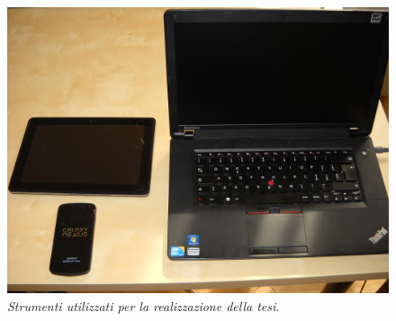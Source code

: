 \begin{figure}[thp]
\centering
\includegraphics[scale=0.1]{img/lavoro.JPG}
\caption{\textit{Strumenti utilizzati per la realizzazione della tesi}.}
\label{fig:objofwork}
\end{figure}
